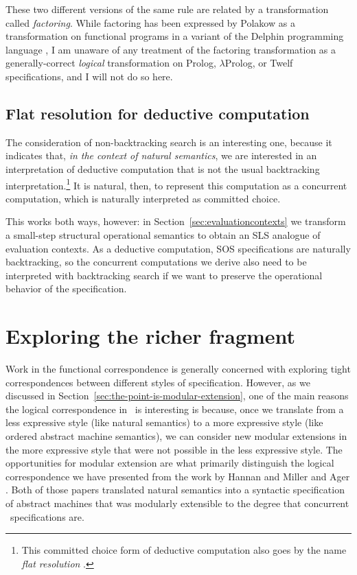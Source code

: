 These two different versions of the same rule are related by a
transformation called {\it factoring}. While factoring has been
expressed by Polakow as a transformation on functional programs in a
variant of the Delphin programming language
\cite{poswolsky03factoring}, I am unaware of any treatment of the
factoring transformation as a generally-correct {\it logical}
transformation on Prolog, $\lambda$Prolog, or Twelf specifications,
and I will not do so here.

\subsection{Flat resolution for deductive computation}

The consideration of non-backtracking search is an interesting one,
because it indicates that, {\it in the context of natural semantics},
we are interested in an interpretation of deductive computation that is
not the usual backtracking interpretation.\footnote{This committed
  choice form of deductive computation also goes by the name {\it flat
    resolution} \cite{aitkaci99warrens}.} It is natural, then, to
represent this computation as a concurrent computation, which is
naturally interpreted as committed choice. 

This works both ways, however: in Section~\ref{sec:evaluationcontexts}
we transform a small-step structural operational semantics to obtain
an SLS analogue of evaluation contexts. As a deductive computation,
SOS specifications are naturally backtracking, so the concurrent
computations we derive also need to be interpreted with backtracking
search if we want to preserve the operational behavior of the
specification.



\section{Exploring the richer fragment}
\label{sec:richer-ordered-abstract}

Work in the functional correspondence is generally concerned with
exploring tight correspondences between different styles of
specification. However, as we discussed in
Section~\ref{sec:the-point-is-modular-extension}, one of the main
reasons the logical correspondence in \sls~is interesting is because,
once we translate from a less expressive style (like natural
semantics) to a more expressive style (like ordered abstract machine
semantics), we can consider new modular extensions in the more
expressive style that were not possible in the less expressive
style. The opportunities for modular extension are what primarily
distinguish the logical correspondence we have presented from the work
by Hannan and Miller \cite{hannan92operational} and Ager
\cite{ager04natural}. Both of those papers translated natural
semantics into a syntactic specification of abstract machines that was
modularly extensible to the degree that concurrent \sls~specifications
are.

